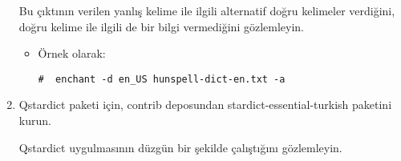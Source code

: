 \documentclass[a4paper,10pt]{article}
\begin{document}
\begin{enumerate}
Bu çıktının verilen yanlış kelime ile ilgili alternatif doğru kelimeler verdiğini, doğru kelime ile ilgili de bir bilgi vermediğini gözlemleyin.

\begin{itemize}
 \item Örnek olarak: 
\begin{verbatim}
#  enchant -d en_US hunspell-dict-en.txt -a
\end{verbatim}

\end{itemize}
 \item Qstardict paketi için, contrib deposundan stardict-essential-turkish paketini kurun.

	Qstardict uygulmasının düzgün bir şekilde çalıştığını gözlemleyin.
\end{enumerate}
\end{document}
